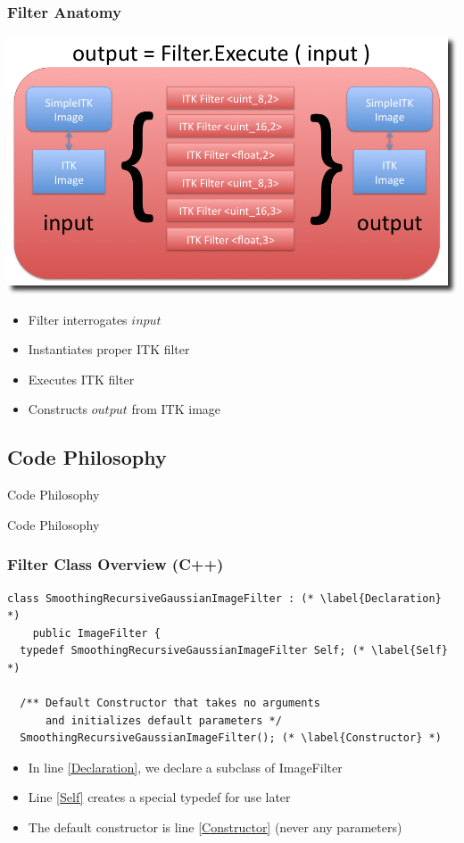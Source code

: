 \begin{frame}[fragile]
\frametitle{Filter Anatomy}
\begin{center}
  \includegraphics[width=.8\textwidth]{Images/FilterInternals_shadow}
\end{center}
\begin{itemize}
  \item Filter interrogates $input$
  \item Instantiates proper ITK filter
  \item Executes ITK filter
  \item Constructs $output$ from ITK image
\end{itemize}
\end{frame}

\subsection{Code Philosophy}
\begin{frame}{Code Philosophy}
\fontsize{36pt}{36pt}\selectfont
\center
\begin{center}
Code Philosophy
\end{center}
\end{frame}

\begin{frame}[fragile]
\frametitle{Filter Class Overview (C++)}
\lstcpp
\begin{lstlisting}
class SmoothingRecursiveGaussianImageFilter : (* \label{Declaration} *)
    public ImageFilter {
  typedef SmoothingRecursiveGaussianImageFilter Self; (* \label{Self} *)

  /** Default Constructor that takes no arguments
      and initializes default parameters */
  SmoothingRecursiveGaussianImageFilter(); (* \label{Constructor} *)

\end{lstlisting}
\begin{itemize}
  \item In line \ref{Declaration}, we declare a subclass of ImageFilter
  \item Line \ref{Self} creates a special typedef for use later
  \item The default constructor is line \ref{Constructor} (never any parameters)
\end{itemize}
\end{frame}



